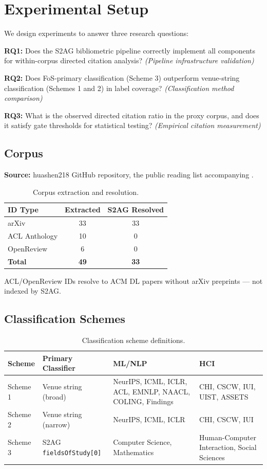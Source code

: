 \section{Experimental Setup}
\label{sec:experiments}

We design experiments to answer three research questions:

\textbf{RQ1:} Does the S2AG bibliometric pipeline correctly implement all components for within-corpus directed citation analysis? \emph{(Pipeline infrastructure validation)}

\textbf{RQ2:} Does FoS-primary classification (Scheme 3) outperform venue-string classification (Schemes 1 and 2) in label coverage? \emph{(Classification method comparison)}

\textbf{RQ3:} What is the observed directed citation ratio in the proxy corpus, and does it satisfy gate thresholds for statistical testing? \emph{(Empirical citation measurement)}

\subsection{Corpus}

\textbf{Source:} huashen218 GitHub repository, the public reading list accompanying \citet{Shen2024Position}.

\begin{table}[h]
\centering
\caption{Corpus extraction and resolution.}
\label{tab:corpus}
\begin{tabular}{lcc}
\toprule
ID Type & Extracted & S2AG Resolved \\
\midrule
arXiv & 33 & 33 \\
ACL Anthology & 10 & 0 \\
OpenReview & 6 & 0 \\
\textbf{Total} & \textbf{49} & \textbf{33} \\
\bottomrule
\end{tabular}
\end{table}

ACL/OpenReview IDs resolve to ACM DL papers without arXiv preprints --- not indexed by S2AG.

\subsection{Classification Schemes}

\begin{table}[h]
\centering
\caption{Classification scheme definitions.}
\label{tab:schemes}
\begin{tabular}{llp{3.2cm}p{2.5cm}}
\toprule
Scheme & Primary Classifier & ML/NLP & HCI \\
\midrule
Scheme 1 & Venue string (broad) & NeurIPS, ICML, ICLR, ACL, EMNLP, NAACL, COLING, Findings & CHI, CSCW, IUI, UIST, ASSETS \\
Scheme 2 & Venue string (narrow) & NeurIPS, ICML, ICLR & CHI, CSCW, IUI \\
Scheme 3 & S2AG \texttt{fieldsOfStudy[0]} & Computer Science, Mathematics & Human-Computer Interaction, Social Sciences \\
\bottomrule
\end{tabular}
\end{table}

